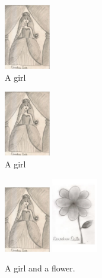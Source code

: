 \documentclass{article}
\begin{document}
\begin{figure}
    \centering
    \includegraphics[width=2.0cm]{girl}
    \caption{A girl}
    \label{fig:girl}
\end{figure}


\begin{figure}
    \centering
    \includegraphics[width=2.0cm, angle=30]{girl}
    \caption{A girl}
    \label{fig:girl}
\end{figure}


\begin{figure}[!hbt]
    \centering
    \includegraphics[width=2.0cm]{girl}\hfill
    \includegraphics[width=2.0cm]{flower}
    \caption{A girl and a flower.}
    \label{girl_flower}
\end{figure}
\end{document}

